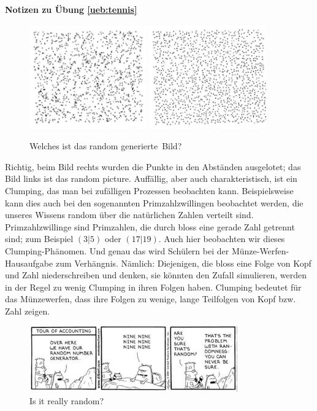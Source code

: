 \documentclass[%
<<<<<<< Updated upstream
11pt,%
twoside,%
titlepage,%
german,%
=======
11pt,%
twoside,%
titlepage,%
swissgerman,%
>>>>>>> Stashed changes
headsepline%
]{scrartcl}
\newcommand{\faReturnGray}{\textcolor{gray}{\faMailReply}} %
\newcommand{\definition}[1]{\colorbox{emerald}{#1}}
\theoremstyle{definition}
\theoremstyle{plain}
\newcommand{\concatueb}[1]{ueb:#1}%
\newcommand{\concatlsg}[1]{lsg:#1}%
\newenvironment{lsg}[1]{%
    \par\noindent\textbf{Notizen zu Übung \ref{\concatueb{#1}}}\label{\concatlsg{#1}}
    \hfill\hyperref[\concatueb{#1}]{\faReturnGray}\par %
}{%
    \par%
}
\newcommand{\concatueb}[1]{ueb:#1}%
\newcommand{\concatlsg}[1]{lsg:#1}%
\newenvironment{lsg}[1]{%
    \par\noindent\textbf{Notizen zu Übung \ref{\concatueb{#1}}.}%
    \label{\concatlsg{#1}}
}{%
    \par%
}
\newcommand{\definition}[1]{\colorbox{emerald}{#1}}
\begin{document}
\begin{lsg}{tennis}
\begin{figure}[h]
    \centering
    \includegraphics[width=0.45\textwidth]{pictures/pointa.jpg}
    \includegraphics[width=0.45\textwidth]{pictures/pointb.jpg}
    \caption{Welches ist das \glqq random generierte\grqq\ Bild?}
    \label{fig:randomness}
\end{figure}

Richtig, beim Bild rechts wurden die Punkte in den Abständen ausgelotet; das Bild links ist das random picture. Auffällig, aber auch charakteristisch, ist ein \glqq Clumping\grqq, das man bei zufälligen Prozessen beobachten kann. Beispielsweise kann dies auch bei den sogenannten Primzahlzwillingen beobachtet werden, die unseres Wissens random über die natürlichen Zahlen verteilt sind. \definition{Primzahlzwillinge} sind Primzahlen, die durch bloss eine gerade Zahl getrennt sind; zum Beispiel $(3|5)$ oder $(17|19)$. Auch hier beobachten wir dieses Clumping-Phänomen. Und genau das wird Schülern bei der Münze-Werfen-Hausaufgabe zum Verhängnis. Nämlich: Diejenigen, die bloss eine Folge von Kopf und Zahl niederschreiben und denken, sie könnten den Zufall simulieren, werden in der Regel zu wenig Clumping in ihren Folgen haben. Clumping bedeutet für das Münzewerfen, dass ihre Folgen zu wenige, lange Teilfolgen von Kopf bzw. Zahl zeigen.

\begin{figure}
    \centering
    \includegraphics[width=0.8\textwidth]{pictures/randomgenerator.jpg}
    \caption{Is it really random?}
\end{figure}


\end{lsg}
\end{document}
